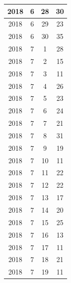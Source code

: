 \begin{longtable} {|c|c|c|c|}
\hline
2018         & 6            & 28           & 30                        \\ 
\hline
2018         & 6            & 29           & 23                        \\ 
\hline
2018         & 6            & 30           & 35                        \\ 
\hline
2018         & 7            & 1            & 28                        \\ 
\hline
2018         & 7            & 2            & 15                        \\ 
\hline
2018         & 7            & 3            & 11                        \\ 
\hline
2018         & 7            & 4            & 26                        \\ 
\hline
2018         & 7            & 5            & 23                        \\ 
\hline
2018         & 7            & 6            & 24                        \\ 
\hline
2018         & 7            & 7            & 21                        \\ 
\hline
2018         & 7            & 8            & 31                        \\ 
\hline
2018         & 7            & 9            & 19                        \\ 
\hline
2018         & 7            & 10           & 11                        \\ 
\hline
2018         & 7            & 11           & 22                        \\ 
\hline
2018         & 7            & 12           & 22                        \\ 
\hline
2018         & 7            & 13           & 17                        \\ 
\hline
2018         & 7            & 14           & 20                        \\ 
\hline
2018         & 7            & 15           & 25                        \\ 
\hline
2018         & 7            & 16           & 13                        \\ 
\hline
2018         & 7            & 17           & 11                        \\ 
\hline
2018         & 7            & 18           & 21                        \\ 
\hline
2018         & 7            & 19           & 11                        \\ 

\end{longtable}
